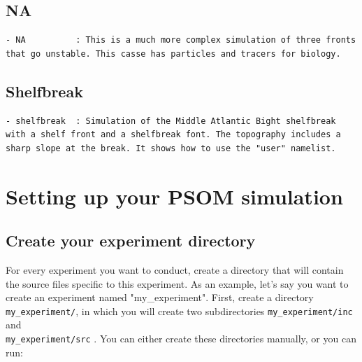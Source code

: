 \documentclass[12pt,letterpaper,titlepage]{article}
\begin{document}
\subsection{NA}
\label{sec: NA}
\begin{lstlisting}
- NA          : This is a much more complex simulation of three fronts that go unstable. This casse has particles and tracers for biology.
\end{lstlisting}

\subsection{Shelfbreak}
\label{sec: Shelfbreak}
\begin{lstlisting}
- shelfbreak  : Simulation of the Middle Atlantic Bight shelfbreak with a shelf front and a shelfbreak font. The topography includes a sharp slope at the break. It shows how to use the "user" namelist. 
\end{lstlisting}

\section{Setting up your PSOM simulation}
\subsection{Create your experiment directory}

For every experiment you want to conduct, create a directory that will contain the source files specific to this experiment. As an example, let's say you want to create an experiment named "my\_experiment". First, create a directory \texttt{my\_experiment/}, in which you will create two subdirectories \texttt{my\_experiment/inc} and \\\texttt{my\_experiment/src} . You can either create these directories manually, or you can run:
\end{document}
